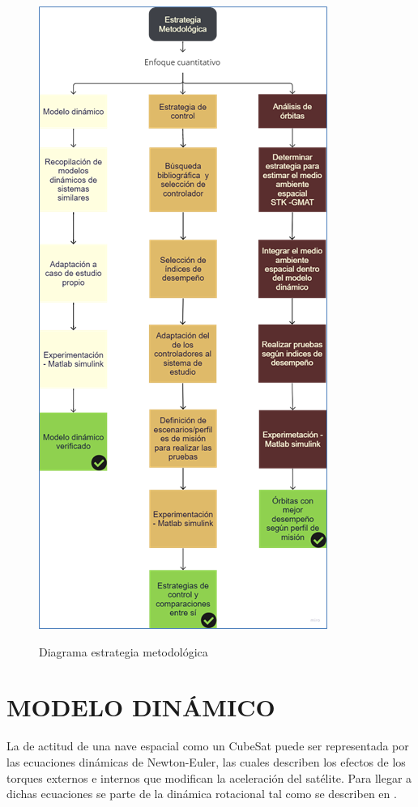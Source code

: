 \newpage
\begin{figure}[!ht]
	\begin{center}
		\includegraphics[scale=0.8]{imagenes/metodologia/grafico_metodologia.png}\\
	\end{center}
	\caption{Diagrama estrategia metodológica}
	\label{fig:metodologia}
	\textit{}
\end{figure}


\newpage
\section{MODELO DINÁMICO}
La de actitud de una nave espacial como un CubeSat puede ser representada por las ecuaciones dinámicas de Newton-Euler, las cuales describen los efectos de los torques externos e internos que modifican la aceleración del satélite. Para llegar a dichas ecuaciones se parte de la dinámica rotacional tal como se describen en \cite{Griffin2004}.

